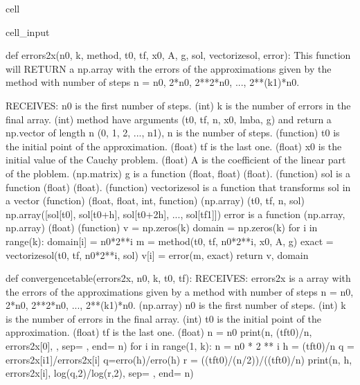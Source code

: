 \documentclass[letterpaper,10pt,english]{jupyterBook}
\begin{document}
\begin{sphinxuseclass}{cell}
\begin{sphinxVerbatimInput}
\begin{sphinxuseclass}{cell_input}
\begin{sphinxVerbatim}[commandchars=\\\{\}]
def errors\PYGZus{}2x(n0, k, method, t0, tf, x0, A, g, sol, vectorize\PYGZus{}sol, error):
  \PYGZsq{}\PYGZsq{}\PYGZsq{}
  This function will RETURN a np.array with the errors of the approximations given
  by the method with number of steps n = n0, 2*n0, 2**2*n0, ..., 2**(k\PYGZhy{}1)*n0.

  RECEIVES:
  n0 is the first number of steps. (int)
  k is the number of errors in the final array. (int)
  method have arguments (t0, tf, n, x0, lmba, g) and return a
  np.vector of length n (0, 1, 2, ..., n\PYGZhy{}1), n is the number of steps. (function)
  t0 is the initial point of the approximation. (float)
  tf is the last one. (float)
  x0 is the initial value of the Cauchy problem. (float)
  A is the coefficient of the linear part of the ploblem. (np.matrix)
  g is a function (float, float) \PYGZhy{}\PYGZgt{} (float). (function)
  sol is a function (float) \PYGZhy{}\PYGZgt{} (float). (function)
  vectorize\PYGZus{}sol is a function that \PYGZdq{}transforms sol in a vector\PYGZdq{} (function)
  (float, float, int, function) \PYGZhy{}\PYGZgt{} (np.array)
  (t0, tf, n, sol) \PYGZhy{}\PYGZgt{} np.array([sol[t0], sol[t0+h], sol[t0+2h], ..., sol[tf\PYGZhy{}1]])
  error is a function (np.array, np.array) \PYGZhy{}\PYGZgt{} (float) (function)
  \PYGZsq{}\PYGZsq{}\PYGZsq{}
  v = np.zeros(k)
  domain = np.zeros(k)
  for i in range(k):
    domain[i] = n0*2**i
    m = method(t0, tf, n0*2**i, x0, A, g)
    exact = vectorize\PYGZus{}sol(t0, tf, n0*2**i, sol)
    v[i] = error(m, exact)
  return v, domain

def convergence\PYGZus{}table(errors\PYGZus{}2x, n0, k, t0, tf):
  \PYGZsq{}\PYGZsq{}\PYGZsq{}
  RECEIVES:
  errors\PYGZus{}2x is a array with the errors of the approximations given
  by a method with number of steps n = n0, 2*n0, 2**2*n0, ..., 2**(k\PYGZhy{}1)*n0. (np.array)
  n0 is the first number of steps. (int)
  k is the number of errors in the final array. (int)
  t0 is the initial point of the approximation. (float)
  tf is the last one. (float)
  \PYGZsq{}\PYGZsq{}\PYGZsq{}
  n = n0
  print(n, (tf\PYGZhy{}t0)/n, errors\PYGZus{}2x[0], \PYGZdq{}\PYGZhy{}\PYGZdq{}, sep=\PYGZdq{} \PYGZam{} \PYGZdq{}, end=\PYGZdq{} \PYGZbs{}\PYGZbs{}\PYGZbs{}\PYGZbs{} \PYGZbs{}n\PYGZdq{})
  for i in range(1, k):
      n = n0 * 2 ** i
      h = (tf\PYGZhy{}t0)/n
      q = errors\PYGZus{}2x[i\PYGZhy{}1]/errors\PYGZus{}2x[i] \PYGZsh{}q=erro(h)/erro(h)
      r = ((tf\PYGZhy{}t0)/(n/2))/((tf\PYGZhy{}t0)/n)
      print(n, h, errors\PYGZus{}2x[i], log(q,2)/log(r,2), sep=\PYGZdq{} \PYGZam{} \PYGZdq{}, end=\PYGZdq{} \PYGZbs{}\PYGZbs{}\PYGZbs{}\PYGZbs{} \PYGZbs{}n\PYGZdq{})


\end{sphinxVerbatim}
\end{sphinxuseclass}
\end{sphinxVerbatimInput}
\end{sphinxuseclass}
\end{document}
